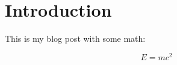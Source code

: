 \documentclass{article}
\begin{document}
\section{Introduction}
This is my blog post with some math:

\begin{equation}
  E = mc^2
\end{equation}
\end{document}
